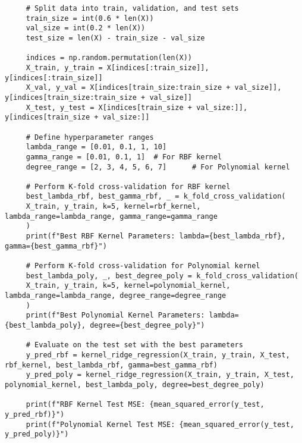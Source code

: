 \documentclass[letterpaper]{article}
\begin{document}
\begin{lstlisting}
     # Split data into train, validation, and test sets
     train_size = int(0.6 * len(X))
     val_size = int(0.2 * len(X))
     test_size = len(X) - train_size - val_size
     
     indices = np.random.permutation(len(X))
     X_train, y_train = X[indices[:train_size]], y[indices[:train_size]]
     X_val, y_val = X[indices[train_size:train_size + val_size]], y[indices[train_size:train_size + val_size]]
     X_test, y_test = X[indices[train_size + val_size:]], y[indices[train_size + val_size:]]
     
     # Define hyperparameter ranges
     lambda_range = [0.01, 0.1, 1, 10]
     gamma_range = [0.01, 0.1, 1]  # For RBF kernel
     degree_range = [2, 3, 4, 5, 6, 7]      # For Polynomial kernel
     
     # Perform K-fold cross-validation for RBF kernel
     best_lambda_rbf, best_gamma_rbf, _ = k_fold_cross_validation(
     X_train, y_train, k=5, kernel=rbf_kernel, lambda_range=lambda_range, gamma_range=gamma_range
     )
     print(f"Best RBF Kernel Parameters: lambda={best_lambda_rbf}, gamma={best_gamma_rbf}")
     
     # Perform K-fold cross-validation for Polynomial kernel
     best_lambda_poly, _, best_degree_poly = k_fold_cross_validation(
     X_train, y_train, k=5, kernel=polynomial_kernel, lambda_range=lambda_range, degree_range=degree_range
     )
     print(f"Best Polynomial Kernel Parameters: lambda={best_lambda_poly}, degree={best_degree_poly}")
     
     # Evaluate on the test set with the best parameters
     y_pred_rbf = kernel_ridge_regression(X_train, y_train, X_test, rbf_kernel, best_lambda_rbf, gamma=best_gamma_rbf)
     y_pred_poly = kernel_ridge_regression(X_train, y_train, X_test, polynomial_kernel, best_lambda_poly, degree=best_degree_poly)
     
     print(f"RBF Kernel Test MSE: {mean_squared_error(y_test, y_pred_rbf)}")
     print(f"Polynomial Kernel Test MSE: {mean_squared_error(y_test, y_pred_poly)}")
\end{lstlisting}
\end{document}
